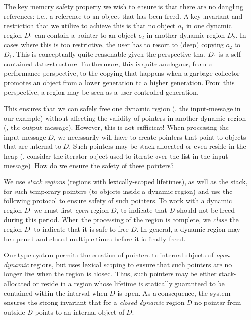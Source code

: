 The key memory safety property we wish to ensure is that there are no
dangling references: i.e., a reference to an object that has been
freed.  A key invariant and restriction that we utilize to achieve
this is that no object $o_1$ in one dynamic region $D_1$ can contain a
pointer to an object $o_2$ in another dynamic region $D_2$.  In cases
where this is too restrictive, the user has to resort to (deep)
copying $o_2$ to $D_1$.  This is conceptually quite reasonable given
the perspective that $D_1$ is a self-contained data-structure.
Furthermore, this is quite analogous, from a performance perspective,
to the copying that happens when a garbage collector promotes an
object from a lower generation to a higher generation.  From this
perspective, a region may be seen as a user-controlled generation.

This ensures that we can safely free one dynamic region (\eg, the
input-message in our example) without affecting the validity of
pointers in another dynamic region (\eg, the output-message).
However, this is not sufficient!  When processing the input-message
$D$, we necessarily will have to create pointers that point to objects
that are internal to $D$. Such pointers may be stack-allocated or even
reside in the heap (\eg, consider the iterator object used to iterate
over the list in the input-message).  How do we ensure the safety of
these pointers?

We use \emph{stack regions} (regions with lexically-scoped lifetimes),
as well as the stack, for such temporary pointers (to objects inside a
dynamic region) and use the following protocol to ensure safety of
such pointers.  To work with a dynamic region $D$, we must first
\emph{open} region $D$, to indicate that $D$ should not be freed
during this period.  When the processing of the region is complete, we
\emph{close} the region $D$, to indicate that it is safe to free $D$.
In general, a dynamic region may be opened and closed multiple times
before it is finally freed.

Our type-system permits the creation of pointers to internal objects
of \emph{open dynamic} regions, but uses lexical scoping to ensure
that such pointers are no longer live when the region is closed.
Thus, such pointers may be either stack-allocated or reside in a
region whose lifetime is statically guaranteed to be contained within
the interval when $D$ is open.  As a consequence, the system ensures
the strong invariant that for a \emph{closed dynamic} region $D$ no
pointer from outside $D$ points to an internal object of $D$.

